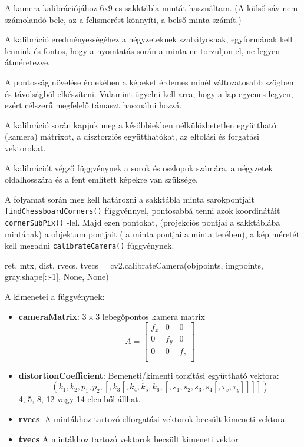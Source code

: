 A kamera kalibrációjához 6x9-es sakktábla mintát használtam. (A külső sáv nem számolandó bele, az a felismerést könnyíti, a belső minta számít.) 

A kalibráció eredményességéhez a négyzeteknek szabályosnak, egyformának kell lenniük és fontos, hogy a nyomtatás során a minta ne torzuljon el, ne legyen átméretezve. 

A pontosság növelése érdekében a képeket érdemes minél változatosabb szögben és távolságból elkészíteni. Valamint ügyelni kell arra, hogy a lap egyenes legyen, ezért célszerű megfelelő támaszt használni hozzá.

A kalibráció során kapjuk meg a későbbiekben nélkülözhetetlen együttható (kamera) mátrixot, a disztorziós együtthatókat, az eltolási és forgatási vektorokat.

A kalibrációt végző függvénynek a sorok és oszlopok számára, a négyzetek oldalhosszára és a fent említett képekre van szüksége.

A folyamat során meg kell határozni a sakktábla minta sarokpontjait \\
\texttt{findChessboardCorners()} függvénnyel, pontosabbá tenni azok koordinátáit \\
\texttt{cornerSubPix()} -lel. Majd ezen pontokat, (projekciós pontjai a sakktáblába mintának) a objektum pontjait ( a minta pontjai a minta terében), a kép méretét kell megadni \texttt{calibrateCamera()} függvénynek. \\

\begin{python}
  ret, mtx, dist, rvecs, tvecs = cv2.calibrateCamera(objpoints,
   imgpoints, gray.shape[::-1], None, None)
\end{python} 

A kimenetei a függvénynek:
\begin{itemize}
\item {\bf cameraMatrix}: $3 \times 3$ lebegőpontos kamera matrix
\[
A = 
\begin{bmatrix}
	f_x & 0 & 0 \\
	0 & f_y & 0 \\
	0 & 0 & f_z \\
\end{bmatrix}
\]

\item {\bf distortionCoefficient}: Bemeneti/kimenti torzítási együttható vektora:
\[
(k_1, k_2, p_1, p_2, [, k_3 [, k_4, k_5, k_6, [, s_1, s_2, s_3, s_4 [, \tau_x, \tau_y]]]])
\]
4, 5, 8, 12 vagy 14 elemből állhat.

\item {\bf rvecs}: A mintákhoz tartozó elforgatási vektorok becsült kimeneti vektora.

\item {\bf tvecs}  A mintákhoz tartozó vektorok becsült kimeneti vektor
\end{itemize}


